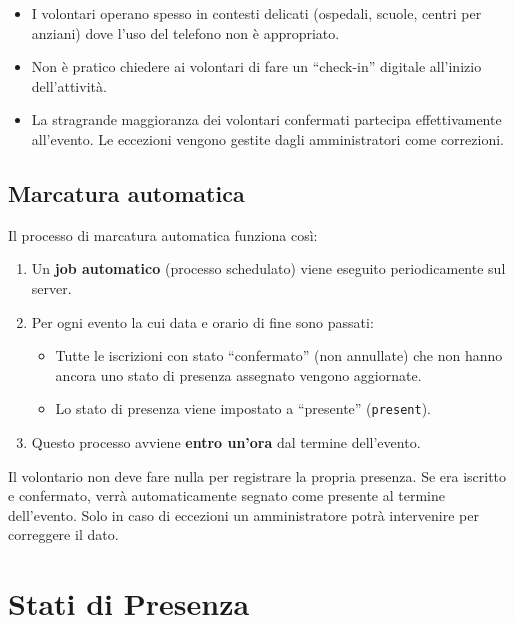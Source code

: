 \documentclass[a4paper,11pt,oneside]{book}
\begin{document}
\begin{itemize}[leftmargin=1.5em]
  \item I volontari operano spesso in contesti delicati (ospedali, scuole, centri per anziani) dove l'uso del telefono non \`e appropriato.
  \item Non \`e pratico chiedere ai volontari di fare un ``check-in'' digitale all'inizio dell'attivit\`a.
  \item La stragrande maggioranza dei volontari confermati partecipa effettivamente all'evento. Le eccezioni vengono gestite dagli amministratori come correzioni.
\end{itemize}

\subsection{Marcatura automatica}

Il processo di marcatura automatica funziona cos\`i:

\begin{enumerate}[leftmargin=1.5em]
  \item Un \textbf{job automatico} (processo schedulato) viene eseguito periodicamente sul server.
  \item Per ogni evento la cui data e orario di fine sono passati:
    \begin{itemize}
      \item Tutte le iscrizioni con stato ``confermato'' (non annullate) che non hanno ancora uno stato di presenza assegnato vengono aggiornate.
      \item Lo stato di presenza viene impostato a ``presente'' (\texttt{present}).
    \end{itemize}
  \item Questo processo avviene \textbf{entro un'ora} dal termine dell'evento.
\end{enumerate}

\begin{infobox}
Il volontario non deve fare nulla per registrare la propria presenza. Se era iscritto e confermato, verr\`a automaticamente segnato come presente al termine dell'evento. Solo in caso di eccezioni un amministratore potr\`a intervenire per correggere il dato.
\end{infobox}

\section{Stati di Presenza}
\label{sec:stati-presenza}
\end{document}
